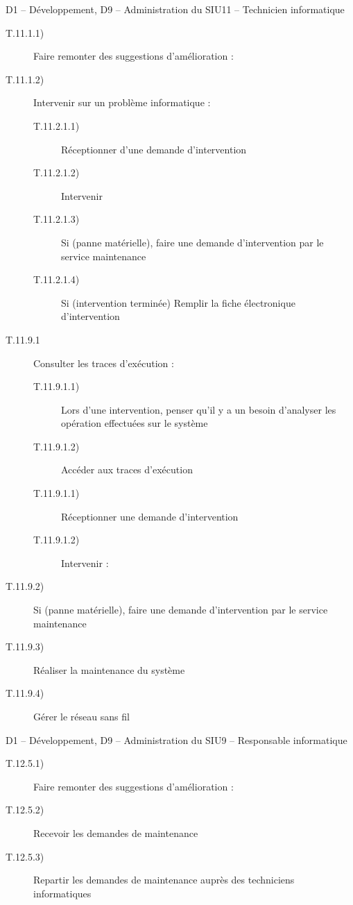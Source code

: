 \dta
{D1 -- Développement, D9 -- Administration du SI}{U11 -- Technicien informatique}{~}{
\begin{description}
	\item [T.11.1.1)] Faire remonter des suggestions d'amélioration \typeactivite{[manuel]} : 	
	\item [T.11.1.2)] Intervenir sur un problème informatique : 
	\begin{description}
		\item [T.11.2.1.1)] Réceptionner d'une demande d'intervention \typeactivite{[système]}
		\item [T.11.2.1.2)] Intervenir \typeactivite{[manuel]}
		\item [T.11.2.1.3)] Si (panne matérielle), faire une demande d'intervention par le service maintenance \typeactivite{[système]}
		\item [T.11.2.1.4)] Si (intervention terminée) Remplir la fiche électronique d'intervention \typeactivite{[système]}
	\end{description}
	\item [T.11.9.1] Consulter les traces d'exécution :  
	\begin{description}
		\item [T.11.9.1.1)] Lors d'une intervention, penser qu'il y a un besoin d'analyser les opération effectuées sur le système \typeactivite{[manuel]}
		\item [T.11.9.1.2)] Accéder aux traces d'exécution \typeactivite{[système]}
		\item [T.11.9.1.1)] Réceptionner une demande d'intervention \typeactivite{[système]}
		\item [T.11.9.1.2)] Intervenir \typeactivite{[manuel]} : 
	\end{description}
	\item [T.11.9.2)] Si (panne matérielle), faire une demande d'intervention par le service maintenance \typeactivite{[système]}
	\item [T.11.9.3)] Réaliser la maintenance du système \typeactivite{[système]}
	\item [T.11.9.4)] Gérer le réseau sans fil \typeactivite{[système]}
\end{description}
}


\dta
{D1 -- Développement, D9 -- Administration du SI}{U9 -- Responsable informatique}{~}
{
\begin{description}
	\item [T.12.5.1)] Faire remonter des suggestions d'amélioration \typeactivite{[manuel]}: 
	\item [T.12.5.2)] Recevoir les demandes de maintenance \typeactivite{[système]}
	\item [T.12.5.3)] Repartir les demandes de maintenance auprès des techniciens informatiques \typeactivite{[système]}
\end{description}
}
